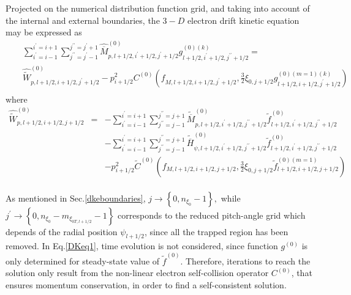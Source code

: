 

\label{dkematrixsection} Projected on the numerical distribution function
grid, and taking into account of the internal and external boundaries, the $%
3-D$ electron drift kinetic equation may be expressed as
\begin{eqnarray}
&&\sum_{i^{\prime }=i-1}^{i^{\prime }=i+1}\sum_{j^{\prime \prime }=j^{\prime
}-1}^{j^{\prime \prime }=j^{\prime }+1}\widehat{\overline{M}}%
_{p,l+1/2,i^{\prime }+1/2,j^{\prime }+1/2}^{\left( 0\right)
}g_{l+1/2,i^{\prime }+1/2,j^{\prime \prime }+1/2}^{\left( 0\right) (k)}=
\nonumber \\
&&\widehat{\widetilde{W}}_{p,l+1/2,i+1/2,j^{\prime }+1/2}^{\left( 0\right)
}-p_{i+1/2}^{2}C^{\left( 0\right) }\left( f_{M,l+1/2,i+1/2,j^{\prime }+1/2},%
\frac{3}{2}\xi _{0,j+1/2}g_{l+1/2,i+1/2,j^{\prime }+1/2}^{\left(
0\right) (m=1)(k)}\right) \nonumber \\ \label{DKeq1}
\end{eqnarray}
where
\begin{eqnarray}
\widehat{\widetilde{W}}_{p,l+1/2,i+1/2,j+1/2}^{\left( 0\right) }
&=&-\sum_{i^{\prime }=i-1}^{i^{\prime }=i+1}\sum_{j^{\prime \prime
}=j-1}^{j^{\prime \prime }=j+1}\widetilde{\overline{M}}_{p,l+1/2,i^{\prime
}+1/2,j^{\prime \prime }+1/2}^{\left( 0\right) }\widetilde{f}%
_{l+1/2,i^{\prime }+1/2,j^{\prime \prime }+1/2}^{\left( 0\right) }  \nonumber
\\
&&-\sum_{i^{\prime }=i-1}^{i^{\prime }=i+1}\sum_{j^{\prime \prime
}=j-1}^{j^{\prime \prime }=j+1}\widetilde{\overline{H}}_{\psi
,l+1/2,i^{\prime }+1/2,j^{\prime \prime }+1/2}^{\left( 0\right) }\widetilde{f%
}_{l+1/2,i^{\prime }+1/2,j^{\prime \prime }+1/2}^{\left( 0\right) }
\nonumber \\
&&-p_{i+1/2}^{2}\widetilde{C}^{\left( 0\right) }\left(
f_{M,l+1/2,i+1/2,j+1/2},\frac{3}{2}\xi _{0,j+1/2}\widetilde{f}%
_{l+1/2,i+1/2,j+1/2}^{\left( 0\right) (m=1)}\right)\nonumber \\
\end{eqnarray}

As mentioned in Sec.\ref{dkeboundaries}, $j\rightarrow \left\{ 0,n_{\xi
_{0}}-1\right\} ,$ while $j^{\prime }\rightarrow \left\{ 0,n_{\xi
_{0}}-m_{\xi _{0T,l+1/2}}-1\right\} $ corresponds to the reduced pitch-angle
grid which depends of the radial position $\psi _{l+1/2}$, since all the
trapped region has been removed. In Eq.\ref{DKeq1}, time evolution is not
considered, since function $g^{\left( 0\right) }$ is only determined for
steady-state value of $\widetilde{f}^{\left( 0\right) }.$ Therefore,
iterations to reach the solution only result from the non-linear electron
self-collision operator $C^{\left( 0\right) }$, that ensures momentum
conservation, in order to find a self-consistent solution.

